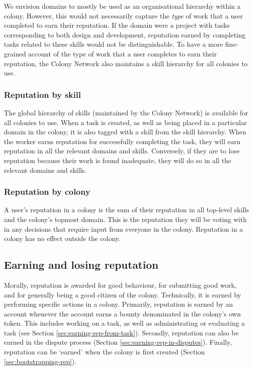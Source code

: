 We envision domains to mostly be used as an organisational hierarchy within a colony. However, this would not necessarily capture the \emph{type} of work that a user completed to earn their reputation. If the domain were a project with tasks corresponding to both design and development, reputation earned by completing tasks related to these skills would not be distinguishable.  To have a more fine-grained account of the type of work that a user completes to earn their reputation, the Colony Network also maintains a skill hierarchy for all colonies to use.

\subsubsection{Reputation by skill}\label{sec:rep-by-skill}

The global hierarchy of skills (maintained by the Colony Network) is available for all colonies to use. When a task is created, as well as being placed in a particular domain in the colony, it is also tagged with a skill from the skill hierarchy. When the worker earns reputation for successfully completing the task, they will earn reputation in all the relevant domains and skills. Conversely, if they are to lose reputation because their work is found inadequate, they will do so in all the relevant domains and skills.

\subsubsection{Reputation by colony}\label{sec:rep-by-colony}
A user's reputation in a colony is the sum of their reputation in all top-level skills and the colony's topmost domain. This is the reputation they will be voting with in any decisions that require input from everyone in the colony. Reputation in a colony has no effect outside the colony.

\subsection{Earning and losing reputation}\label{sec:earning-losing-rep}
Morally, reputation is awarded for good behaviour, for submitting good work, and for generally being a good citizen of the colony. Technically, it is earned by performing specific actions in a colony. Primarily, reputation is earned by an account whenever the account earns a bounty denominated in the colony's own token. This includes working on a task, as well as administrating or evaluating a task (see Section \ref{sec:earning-rep-from-task}). Secondly, reputation can also be earned in the dispute process (Section \ref{sec:earning-rep-in-disputes}). Finally, reputation can be `earned' when the colony is first created (Section \ref{sec:bootstrapping-rep}).


